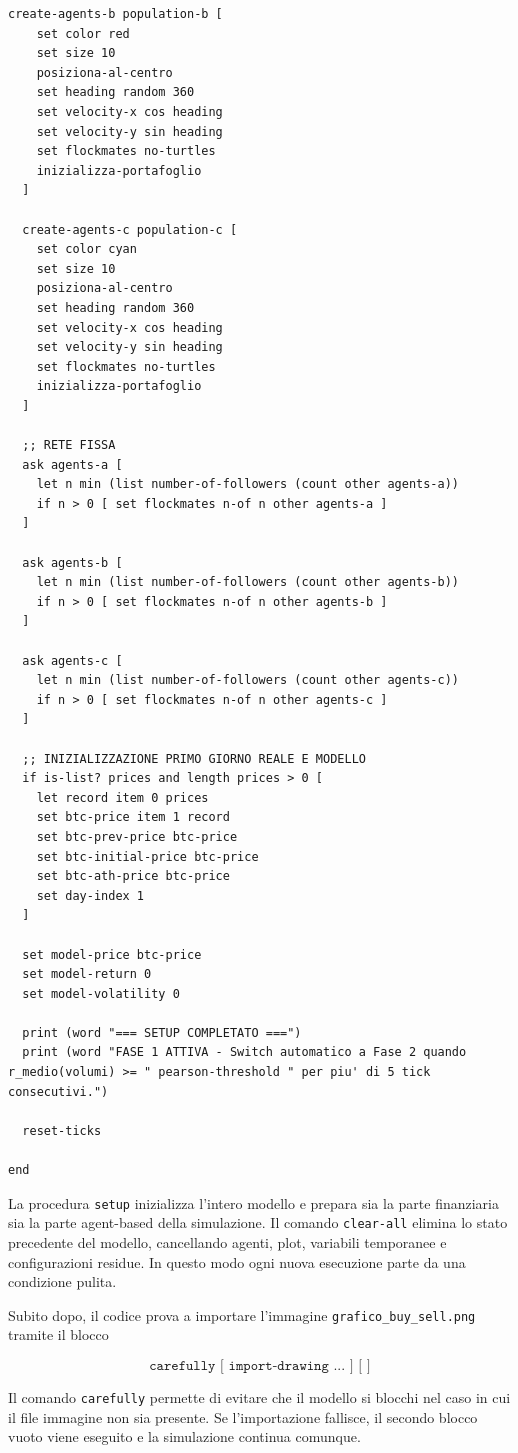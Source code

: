 \begin{lstlisting}[caption={Procedura di setup del modello}]
  create-agents-b population-b [
    set color red
    set size 10
    posiziona-al-centro
    set heading random 360
    set velocity-x cos heading
    set velocity-y sin heading
    set flockmates no-turtles
    inizializza-portafoglio
  ]

  create-agents-c population-c [
    set color cyan
    set size 10
    posiziona-al-centro
    set heading random 360
    set velocity-x cos heading
    set velocity-y sin heading
    set flockmates no-turtles
    inizializza-portafoglio
  ]

  ;; RETE FISSA
  ask agents-a [
    let n min (list number-of-followers (count other agents-a))
    if n > 0 [ set flockmates n-of n other agents-a ]
  ]

  ask agents-b [
    let n min (list number-of-followers (count other agents-b))
    if n > 0 [ set flockmates n-of n other agents-b ]
  ]

  ask agents-c [
    let n min (list number-of-followers (count other agents-c))
    if n > 0 [ set flockmates n-of n other agents-c ]
  ]

  ;; INIZIALIZZAZIONE PRIMO GIORNO REALE E MODELLO
  if is-list? prices and length prices > 0 [
    let record item 0 prices
    set btc-price item 1 record
    set btc-prev-price btc-price
    set btc-initial-price btc-price
    set btc-ath-price btc-price
    set day-index 1
  ]

  set model-price btc-price
  set model-return 0
  set model-volatility 0

  print (word "=== SETUP COMPLETATO ===")
  print (word "FASE 1 ATTIVA - Switch automatico a Fase 2 quando r_medio(volumi) >= " pearson-threshold " per piu' di 5 tick consecutivi.")

  reset-ticks

end
\end{lstlisting}

La procedura \texttt{setup} inizializza l'intero modello e prepara sia la parte
finanziaria sia la parte agent-based della simulazione. Il comando
\texttt{clear-all} elimina lo stato precedente del modello, cancellando agenti,
plot, variabili temporanee e configurazioni residue. In questo modo ogni nuova
esecuzione parte da una condizione pulita.

Subito dopo, il codice prova a importare l'immagine
\texttt{grafico\_buy\_sell.png} tramite il blocco

\[
\texttt{carefully [ import-drawing ... ] [ ]}
\]

Il comando \texttt{carefully} permette di evitare che il modello si blocchi nel
caso in cui il file immagine non sia presente. Se l'importazione fallisce, il
secondo blocco vuoto viene eseguito e la simulazione continua comunque.


